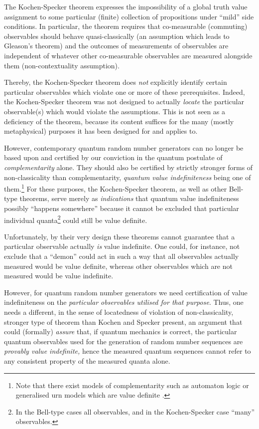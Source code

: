 \documentclass[%
 preprint,
 showpacs,
 showkeys,
 amsmath,
 amssymb,
 aps,
 pra,
 ]{revtex4-1}
\theoremstyle{definition}
\begin{document}
The Kochen-Specker theorem \cite{specker-60,kochen1} expresses the impossibility of a global truth value assignment to
some particular (finite) collection of propositions under ``mild'' side conditions. In particular, the theorem requires
that co-measurable (commuting) observables should behave quasi-classically (an assumption which leads to Gleason's theorem) and
 the outcomes of measurements of observables are independent of whatever other
co-measurable observables are measured alongside them (non-contextuality assumption).

Thereby, the Kochen-Specker theorem does {\em not} explicitly identify
certain particular observables which violate one or more of these prerequisites.
Indeed, the Kochen-Specker theorem was not designed to actually
{\em locate} the particular observable(s) which would violate the assumptions.
This is not seen as a deficiency of the theorem,
because its content suffices for the many (mostly metaphysical) purposes it has been designed for and applies to.

However, contemporary quantum random number generators can no longer be based upon and certified by
our conviction in the quantum postulate of {\em complementarity} alone.
They should also be certified by
 strictly stronger forms of non-classicality than complementarity, {\em quantum value indefiniteness} being one of them.\footnote{Note that there exist models of complementarity such as automaton logic or generalised urn models which are value definite \cite{svozil-2001-eua}.}
For these purposes, the Kochen-Specker theorem, as well as other Bell-type theorems,
serve merely as {\em indications} that  quantum value indefiniteness possibly ``happens somewhere'' because it cannot be excluded that particular individual quanta\footnote{In the Bell-type cases all observables,
and in the Kochen-Specker case ``many'' observables.} could still be value definite.

Unfortunately, by their very design these theorems cannot guarantee that a particular observable actually {\em is} value indefinite.
One could, for instance, not exclude that a ``demon'' could act in such a way that all observables actually measured would be value definite,
whereas other observables which are not measured would be value indefinite.

However, for quantum random number generators we need certification of value indefiniteness on the {\em particular observables utilised for that purpose}.
Thus, one needs a different, in the sense of locatedness of violation of non-classicality, stronger type of theorem
than Kochen and Specker present, an argument that could (formally) {\em assure} that, if quantum mechanics is correct,
the particular quantum observables used for the generation of random number sequences are {\em provably value indefinite,} hence  the measured quantum sequences cannot refer to any consistent property of the measured quanta alone.
\end{document}
